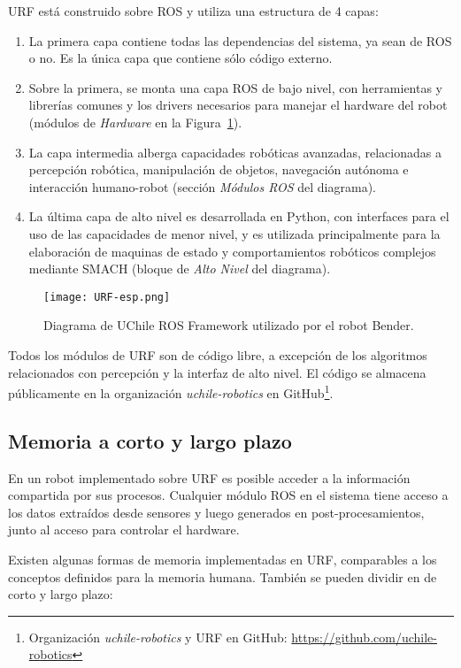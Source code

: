 URF está construido sobre ROS y utiliza una estructura de 4 capas:
\begin{enumerate}
\item La primera capa contiene todas las dependencias del sistema, ya sean de ROS o no. Es la única capa que contiene sólo código externo.
\item  Sobre la primera, se monta una capa ROS de bajo nivel, con herramientas y librerías comunes y los drivers necesarios para manejar el hardware del robot (módulos de \textit{Hardware} en la Figura~\ref{img:URF}).
\item La capa intermedia alberga capacidades robóticas avanzadas, relacionadas a percepción robótica, manipulación de objetos, navegación autónoma e interacción humano-robot (sección \textit{Módulos ROS} del diagrama).
\item La última capa de alto nivel es desarrollada en Python, con interfaces para el uso de las capacidades de menor nivel, y es utilizada principalmente para la elaboración de maquinas de estado y comportamientos robóticos complejos mediante SMACH (bloque de \textit{Alto Nivel} del diagrama).
\end{enumerate}

\begin{figure}[!h]
	\centering
	\texttt{[image: URF-esp.png]}
	\caption{\small Diagrama de UChile ROS Framework utilizado por el robot Bender.}
	\label{img:URF}
\end{figure}

Todos los módulos de URF son de código libre, a excepción de los algoritmos relacionados con percepción y la interfaz de alto nivel. El código se almacena públicamente en la organización \textit{uchile-robotics} en GitHub\footnote{Organización \textit{uchile-robotics} y URF en GitHub: \url{https://github.com/uchile-robotics}}.


\subsection{Memoria a corto y largo plazo}

En un robot implementado sobre URF es posible acceder a la información compartida por sus procesos. Cualquier módulo ROS en el sistema tiene acceso a los datos extraídos desde sensores y luego generados en post-procesamientos, junto al acceso para controlar el hardware.

Existen algunas formas de memoria implementadas en URF, comparables a los conceptos definidos para la memoria humana. También se pueden dividir en de corto y largo plazo:

